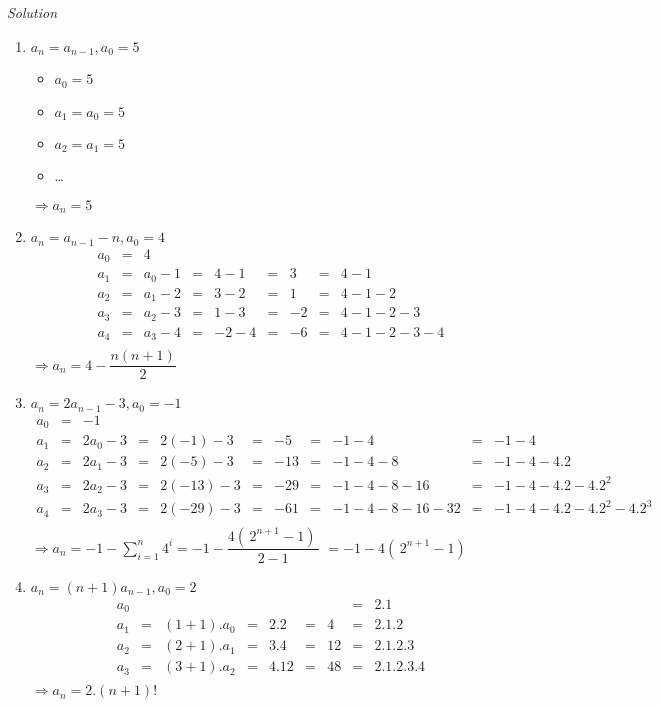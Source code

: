 \documentclass[10pt]{article}
\begin{document}
\bigbreak
\textit{Solution}
\bigbreak 
\begin{enumerate}
    \item $a_{n} = a_{n - 1}, a_{0} = 5$
        \begin{itemize}
            \item $a_{0} = 5$
            \item $a_{1} = a_{0} = 5$
            \item $a_{2} = a_{1} = 5$
            \item \ldots
        \end{itemize}
        $\Rightarrow a_{n} = 5$

    \item $a_{n} = a_{n - 1} - n, a_{0} = 4$
        \begin{align*}
            a_{0} &=& 4  \\
            a_{1} &=& a_{0} - 1 &=& 4 - 1 &=& 3 &=& 4 - 1 \\
            a_{2} &=& a_{1} - 2 &=& 3 - 2 &=& 1 &=& 4 - 1 - 2 \\
            a_{3} &=& a_{2} - 3 &=& 1 - 3 &=& -2 &=& 4 - 1 - 2 - 3 \\
            a_{4} &=& a_{3} - 4 &=& -2 - 4 &=& -6 &=& 4 - 1 - 2 - 3 - 4 \\
        \end{align*}
        $\Rightarrow a_{n} = 4 - \dfrac{n(n + 1)}{2}$

    \item $a_{n} = 2a_{n - 1} - 3, a_{0} = - 1$
        \begin{align*}
            a_{0} &=& -1 \\
            a_{1} &=& 2a_{0} - 3 &=& 2(-1) - 3 &=& -5 &=& -1 - 4 &=& -1 - 4 \\
            a_{2} &=& 2a_{1} - 3 &=& 2(-5) - 3 &=& -13 &=& -1 - 4 - 8 &=& -1 - 4 - 4.2 \\
            a_{3} &=& 2a_{2} - 3 &=& 2(-13) - 3 &=& -29 &=& -1 - 4 - 8 - 16 &=&
                -1 - 4 - 4.2 - 4.2^{2} \\
            a_{4} &=& 2a_{3} - 3 &=& 2(-29) - 3 &=& -61 &=& -1 - 4 - 8 - 16 - 32 &=&
                -1 - 4 - 4.2 - 4.2^{2} - 4.2^{3} \\
        \end{align*}
        $\Rightarrow a_{n} = -1 - \sum_{i = 1}^{n} 4^{i} = -1 - \dfrac{4(\,2^{n + 1} - 1)\,}{2 - 1}$
            $ = -1 - 4(\,2^{n + 1} - 1)\,$

    \item $a_{n} = (n + 1)a_{n - 1}, a_{0} = 2$
        \begin{align*}
            a_{0} && && && &=& 2.1 \\
            a_{1} &=& (1 + 1).a_{0} &=& 2.2 &=& 4 &=& 2.1.2 \\
            a_{2} &=& (2 + 1).a_{1} &=& 3.4 &=& 12 &=& 2.1.2.3 \\
            a_{3} &=& (3 + 1).a_{2} &=& 4.12 &=& 48 &=& 2.1.2.3.4 \\
        \end{align*}
        $\Rightarrow a_{n} = 2.(n + 1)!$


\end{enumerate}
\end{document}
